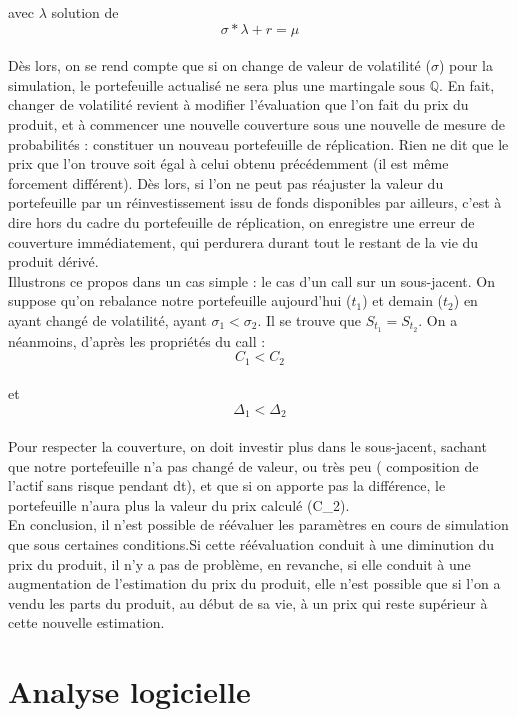 \documentclass[french,12pt,a4paper]{article}
\begin{document}
avec $\lambda$ solution de $$ \sigma * \lambda + r = \mu $$ \\

Dès lors, on se rend compte que si on change de valeur de volatilité ($\sigma$) pour la simulation, le portefeuille actualisé ne sera plus une martingale sous $\mathbb{Q}$. En fait, changer de volatilité revient à modifier l'évaluation que l'on fait du prix du produit, et à commencer une nouvelle couverture sous une nouvelle de mesure de probabilités : constituer un nouveau portefeuille de réplication. Rien ne dit que le prix que l'on trouve soit égal à celui obtenu précédemment (il est même forcement différent). Dès lors, si l'on ne peut pas réajuster la valeur du portefeuille par un réinvestissement issu de fonds disponibles par ailleurs, c'est à dire hors du cadre du portefeuille de réplication, on enregistre une erreur de couverture immédiatement, qui perdurera durant tout le restant de la vie du produit dérivé.\\

Illustrons ce propos dans un cas simple : le cas d'un call sur un sous-jacent. On suppose qu'on rebalance notre portefeuille aujourd'hui ($t_{1}$) et demain ($t_{2}$) en ayant changé de volatilité, ayant $\sigma_{1}<\sigma_{2}$. Il se trouve que $S_{t_{1}}=S_{t_{2}}$. On a néanmoins, d'après les propriétés du call : \\
$$C_{1}<C_{2}$$\\ et $$\Delta_{1}<\Delta_{2}$$ \\
Pour respecter la couverture, on doit investir plus dans le sous-jacent, sachant que notre portefeuille n'a pas changé de valeur, ou très peu ( composition de l'actif sans risque pendant dt), et que si on apporte pas la différence, le portefeuille n'aura plus la valeur du prix calculé (C_{2}).\\

En conclusion, il n'est possible de réévaluer les paramètres en cours de simulation que sous certaines conditions.Si cette réévaluation conduit à une diminution du prix du produit, il n'y a pas de problème, en revanche, si elle conduit à une augmentation de l'estimation du prix du produit, elle n'est possible que si l'on a vendu les parts du produit, au début de sa vie, à un prix qui reste supérieur à cette nouvelle estimation.



\section{Analyse logicielle}
\end{document}
